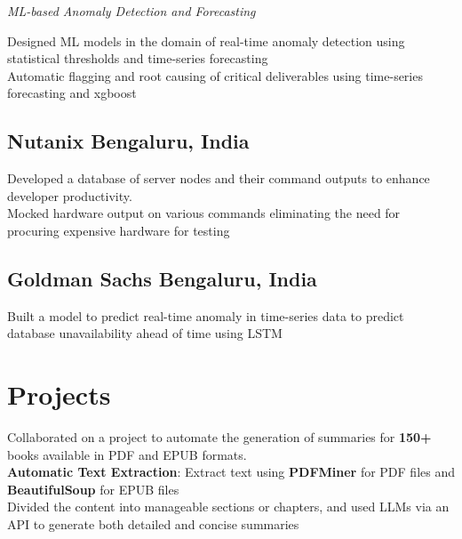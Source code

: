 \documentclass[a4paper]{Resume}
\begin{document}
\sectionsep{}

\textit{ML-based Anomaly Detection and Forecasting}

\pt Designed ML models in the domain of real-time anomaly detection using statistical thresholds and time-series forecasting \\
\pt Automatic flagging and root causing of critical deliverables using time-series forecasting and xgboost \\

\sectionsep

\subsection{Nutanix \hfill \normalfont Bengaluru, India}
\pt Developed a database of server nodes and their command outputs to enhance developer productivity. \\
\pt Mocked hardware output on various commands eliminating the need for procuring expensive hardware for testing \\

\sectionsep

\subsection{Goldman Sachs \hfill \normalfont Bengaluru, India}
\pt Built a model to predict real-time anomaly in time-series data to predict database unavailability ahead of time using LSTM \\
\sectionsep


\section{Projects}
\hrulefill

\pt Collaborated on a project to automate the generation of summaries for \textbf{150+} books available in PDF and EPUB formats. \\
\pt \textbf{Automatic Text Extraction}: Extract text using \textbf{PDFMiner} for PDF files and \textbf{BeautifulSoup} for EPUB files \\
\pt Divided the content into manageable sections or chapters, and used LLMs via an API to generate both detailed and concise summaries \\
\end{document}
